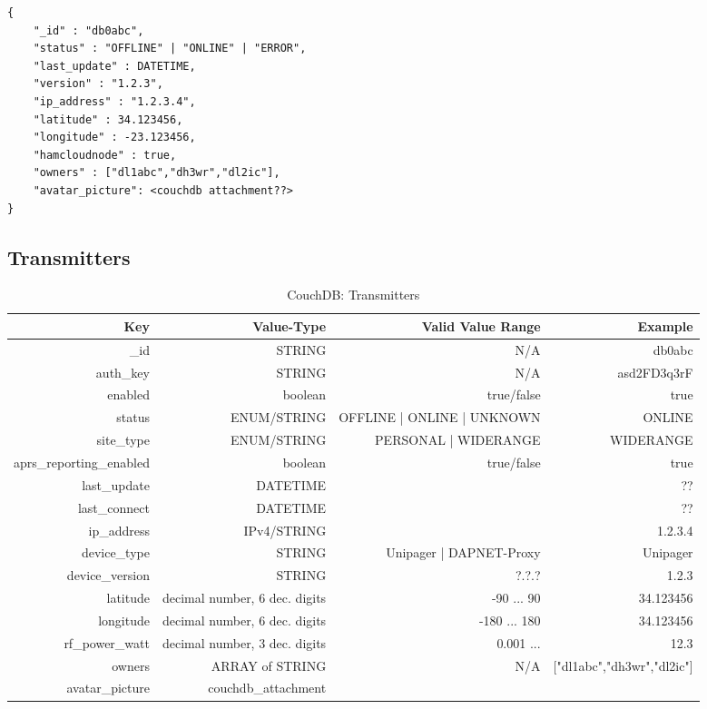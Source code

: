 \begin{lstlisting}
{
	"_id" : "db0abc",
	"status" : "OFFLINE" | "ONLINE" | "ERROR",
	"last_update" : DATETIME,
    "version" : "1.2.3",
    "ip_address" : "1.2.3.4",
    "latitude" : 34.123456,
    "longitude" : -23.123456,
    "hamcloudnode" : true,
    "owners" : ["dl1abc","dh3wr","dl2ic"],
    "avatar_picture": <couchdb attachment??>
}
\end{lstlisting}

\subsection{Transmitters}
\begin{table}[h]
 \caption{CouchDB: Transmitters}
 \begin{tabular}{r|r|r|r}
  Key & Value-Type & Valid Value Range & Example \\
  \hline
  \_id & STRING & N/A & db0abc \\
  auth\_key & STRING & N/A & asd2FD3q3rF \\
  enabled & boolean & true/false & true \\
  status & ENUM/STRING & OFFLINE | ONLINE | UNKNOWN & ONLINE \\
  site\_type & ENUM/STRING & PERSONAL | WIDERANGE & WIDERANGE \\
  aprs\_reporting\_enabled & boolean & true/false & true \\
  last\_update & DATETIME & & ??\\
  last\_connect & DATETIME & & ??\\
  ip\_address & IPv4/STRING & & 1.2.3.4 \\
  device\_type & STRING & Unipager | DAPNET-Proxy & Unipager \\
  device\_version & STRING & ?.?.? & 1.2.3 \\
  latitude & decimal number, 6 dec. digits & -90 ... 90 & 34.123456 \\
  longitude & decimal number, 6 dec. digits & -180 ... 180 & 34.123456 \\
  rf\_power\_watt & decimal number, 3 dec. digits & 0.001 ...  & 12.3 \\ 
    
  
  owners & ARRAY of STRING & N/A & ["dl1abc","dh3wr","dl2ic"] \\
  avatar\_picture & couchdb\_attachment & & \\
  \end{tabular}
  \label{tab:couchdb:transmitters}
\end{table}

